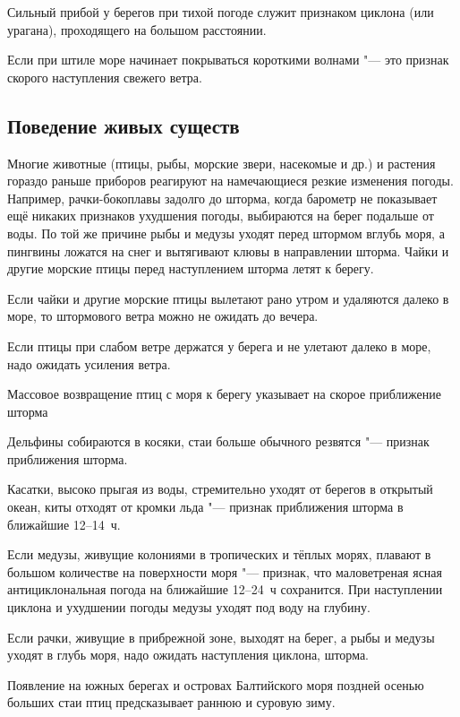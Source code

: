  Сильный прибой у берегов при тихой погоде служит признаком
циклона (или урагана), проходящего на большом расстоянии.

 Если при штиле море начинает покрываться короткими волнами
"--- это признак скорого наступления свежего ветра.

\subsection{Поведение живых существ}

Многие животные (птицы, рыбы, морские звери, насекомые и др.) и
растения гораздо раньше приборов реагируют на намечающиеся резкие
изменения погоды. Например, рачки-бокоплавы задолго до шторма, когда
барометр не показывает ещё никаких признаков ухудшения погоды,
выбираются на берег подальше от воды. По той же причине рыбы и медузы
уходят перед штормом вглубь моря, а пингвины ложатся на снег и
вытягивают клювы в направлении шторма. Чайки и другие морские птицы
перед наступлением шторма летят к берегу.

 Если чайки и другие морские птицы вылетают рано утром и
удаляются далеко в море, то штормового ветра можно не ожидать до
вечера.

 Если птицы при слабом ветре держатся у берега и не улетают далеко
в море, надо ожидать усиления ветра.

 Массовое возвращение птиц с моря к берегу указывает на скорое
приближение шторма

 Дельфины собираются в косяки, стаи больше обычного резвятся
"--- признак приближения шторма.

 Касатки, высоко прыгая из воды, стремительно уходят от берегов
в открытый океан, киты отходят от кромки льда "--- признак приближения
шторма в ближайшие 12--14~ч.

 Если медузы, живущие колониями в тропических и тёплых морях,
плавают в большом количестве на поверхности моря "--- признак, что
маловетреная ясная антициклональная погода на ближайшие 12--24~ч
сохранится. При наступлении циклона и ухудшении погоды медузы уходят
под воду на глубину.

 Если рачки, живущие в прибрежной зоне, выходят на берег, а рыбы и
медузы уходят в глубь моря, надо ожидать наступления циклона, шторма.

 Появление на южных берегах и островах Балтийского моря поздней
осенью больших стаи птиц предсказывает раннюю и суровую зиму.

